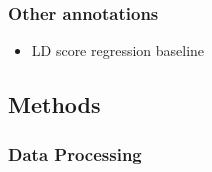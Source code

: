 \subsubsection*{Other annotations}
\label{sec:org4f58a59}


\begin{itemize}
\item LD score regression baseline
\label{sec:org97696e5}
\end{itemize}

\subsection*{Methods}
\label{sec:org53944c4}


\subsubsection*{Data Processing}
\label{sec:orgc908098}

